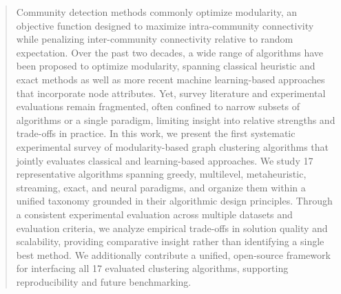 \documentclass[sigconf,review]{acmart}
\begin{document}
\begin{abstract}
  Community detection methods commonly optimize modularity, an objective function designed to maximize intra-community connectivity while penalizing inter-community connectivity relative to random expectation.
  Over the past two decades, a wide range of algorithms have been proposed to optimize modularity, spanning classical heuristic and exact methods as well as more recent machine learning-based approaches that incorporate node attributes. Yet, survey literature and experimental evaluations remain fragmented, often confined to narrow subsets of algorithms or a single paradigm, limiting insight into relative strengths and trade-offs in practice. In this work, we present the first systematic experimental survey of modularity-based graph clustering algorithms that jointly evaluates classical and learning-based approaches. We study 17 representative algorithms spanning greedy, multilevel, metaheuristic, streaming, exact, and neural paradigms, and organize them within a unified taxonomy grounded in their algorithmic design principles. Through a consistent experimental evaluation across multiple datasets and evaluation criteria, we analyze empirical trade-offs in solution quality and scalability, providing comparative insight rather than identifying a single best method. We additionally contribute a unified, open-source framework for interfacing all 17 evaluated clustering algorithms, supporting reproducibility and future benchmarking.


\end{abstract}
\end{document}
